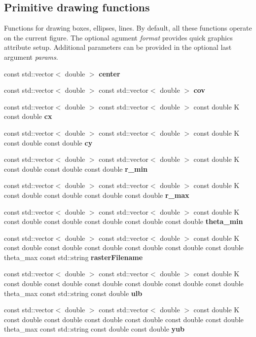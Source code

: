 \subsection*{Primitive drawing functions}
\label{_amgrp40669830a4f0e6a5b95068e28288c5c3}%
Functions for drawing boxes, ellipses, lines. By default, all these functions operate on the current figure. The optional agument {\itshape format} provides quick graphics attribute setup. Additional parameters can be provided in the optional last argument {\itshape params}. \begin{DoxyCompactItemize}
\item 
const std\+::vector$<$ double $>$ {\bfseries center}
\item 
const std\+::vector$<$ double $>$ const std\+::vector$<$ double $>$ {\bfseries cov}
\item 
const std\+::vector$<$ double $>$ const std\+::vector$<$ double $>$ const double K const double {\bfseries cx}
\item 
const std\+::vector$<$ double $>$ const std\+::vector$<$ double $>$ const double K const double const double {\bfseries cy}
\item 
const std\+::vector$<$ double $>$ const std\+::vector$<$ double $>$ const double K const double const double const double {\bfseries r\+\_\+min}
\item 
const std\+::vector$<$ double $>$ const std\+::vector$<$ double $>$ const double K const double const double const double const double {\bfseries r\+\_\+max}
\item 
const std\+::vector$<$ double $>$ const std\+::vector$<$ double $>$ const double K const double const double const double const double const double {\bfseries theta\+\_\+min}
\item 
const std\+::vector$<$ double $>$ const std\+::vector$<$ double $>$ const double K const double const double const double const double const double const double theta\+\_\+max const std\+::string {\bfseries raster\+Filename}
\item 
const std\+::vector$<$ double $>$ const std\+::vector$<$ double $>$ const double K const double const double const double const double const double const double theta\+\_\+max const std\+::string const double {\bfseries ulb}
\item 
const std\+::vector$<$ double $>$ const std\+::vector$<$ double $>$ const double K const double const double const double const double const double const double theta\+\_\+max const std\+::string const double const double {\bfseries yub}

\end{DoxyCompactItemize}
